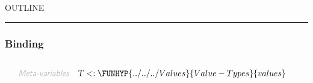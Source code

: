 


    OUTLINE
  \tableofcontents
\begin{center}
\rule{3in}{0.4pt}
\end{center}

\subsubsection{Binding}\hypertarget{binding}{}\label{binding}

\begin{align*}
  [ \
  \KEY{Type} \quad & \FUNREF{environments} \\
  \KEY{Alias} \quad & \FUNREF{envs} \\
  \KEY{Datatype} \quad & \FUNREF{identifiers} \\
  \KEY{Alias} \quad & \FUNREF{ids} \\
  \KEY{Funcon} \quad & \FUNREF{identifier-tagged} \\
  \KEY{Alias} \quad & \FUNREF{id-tagged} \\
  \KEY{Funcon} \quad & \FUNREF{fresh-identifier} \\
  \KEY{Entity} \quad & \FUNREF{environment} \\
  \KEY{Alias} \quad & \FUNREF{env} \\
  \KEY{Funcon} \quad & \FUNREF{initialise-binding} \\
  \KEY{Funcon} \quad & \FUNREF{bind-value} \\
  \KEY{Alias} \quad & \FUNREF{bind} \\
  \KEY{Funcon} \quad & \FUNREF{unbind} \\
  \KEY{Funcon} \quad & \FUNREF{bound-directly} \\
  \KEY{Funcon} \quad & \FUNREF{bound-value} \\
  \KEY{Alias} \quad & \FUNREF{bound} \\
  \KEY{Funcon} \quad & \FUNREF{closed} \\
  \KEY{Funcon} \quad & \FUNREF{scope} \\
  \KEY{Funcon} \quad & \FUNREF{accumulate} \\
  \KEY{Funcon} \quad & \FUNREF{collateral} \\
  \KEY{Funcon} \quad & \FUNREF{bind-recursively} \\
  \KEY{Funcon} \quad & \FUNREF{recursive}
  \ ]
\end{align*}
\begin{align*}
  \KEY{Meta-variables} \quad
  & \VAR{T} <: \FUNHYP{../../../Values}{Value-Types}{values}
\end{align*}
